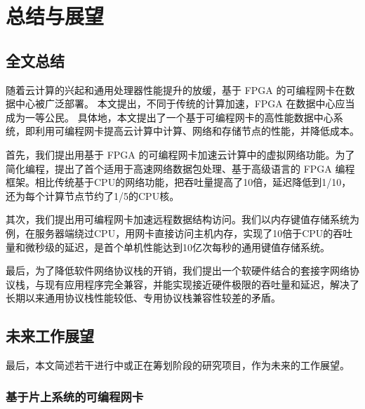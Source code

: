 \chapter{总结与展望}

\section{全文总结}

随着云计算的兴起和通用处理器性能提升的放缓，基于 FPGA 的可编程网卡在数据中心被广泛部署。
本文提出，不同于传统的计算加速，FPGA 在数据中心应当成为一等公民。
具体地，本文提出了一个基于可编程网卡的高性能数据中心系统，即利用可编程网卡提高云计算中计算、网络和存储节点的性能，并降低成本。

首先，我们提出用基于 FPGA 的可编程网卡加速云计算中的虚拟网络功能。为了简化编程，提出了首个适用于高速网络数据包处理、基于高级语言的 FPGA 编程框架。相比传统基于CPU的网络功能，把吞吐量提高了10倍，延迟降低到1/10，还为每个计算节点节约了1/5的CPU核。

其次，我们提出用可编程网卡加速远程数据结构访问。我们以内存键值存储系统为例，在服务器端绕过CPU，用网卡直接访问主机内存，实现了10倍于CPU的吞吐量和微秒级的延迟，是首个单机性能达到10亿次每秒的通用键值存储系统。

最后，为了降低软件网络协议栈的开销，我们提出一个软硬件结合的套接字网络协议栈，与现有应用程序完全兼容，并能实现接近硬件极限的吞吐量和延迟，解决了长期以来通用协议栈性能较低、专用协议栈兼容性较差的矛盾。

\section{未来工作展望}

最后，本文简述若干进行中或正在筹划阶段的研究项目，作为未来的工作展望。

\subsection{基于片上系统的可编程网卡}


